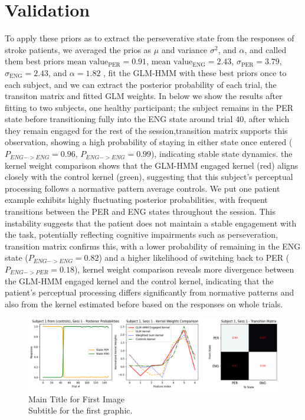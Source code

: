 \section{Validation}
To apply these priors as to extract the perseverative state from the responses of stroke patients, we averaged the prios as $\mu$ and variance $\sigma^2$, and $\alpha$, and called them best priors $\text{mean value}_{\text{PER}} = 0.91$, $\text{mean value}_{\text{ENG}} = 2.43$, $\sigma_{\text{PER}} = 3.79$, $\sigma_{\text{ENG}} = 2.43$, and $\alpha = 1.82$ , fit the GLM-HMM with these best priors once to each subject, and we can extract the posterior probability of each trial, the transiton matrix and fitted GLM weights. In below we show the results after fitting to two subjects, one healthy participant; the subject remains in the PER state before transitioning fully into the ENG state around trial 40, after which they remain engaged for the rest of the session,transition matrix supports this observation, showing a high probability of staying in either state once entered ($P_{ENG->ENG}=0.96$, $P_{ENG->ENG}=0.99$), indicating stable state dynamics.  the kernel weight comparison shows that the GLM-HMM engaged kernel (red) aligns closely with the control kernel (green), suggesting that this subject's perceptual processing follows a normative pattern average controls. We put one patient example exhibits highly fluctuating posterior probabilities, with frequent transitions between the PER and ENG states throughout the session. This instability suggests that the patient does not maintain a stable engagement with the task, potentially reflecting cognitive impairments such as perseveration,  transition matrix confirms this, with a lower probability of remaining in the ENG state ($P_{ENG->ENG}=0.82$) and a higher likelihood of switching back to PER ($P_{ENG->PER}=0.18$), kernel weight comparison reveals more divergence between the GLM-HMM engaged kernel and the control kernel, indicating that the patient’s perceptual processing differs significantly from normative patterns and also from the kernel estimated before based on the responses on whole trials.  
\begin{figure}[H]
    \centering
    \includegraphics[width=18cm]{MainLayout/Images/chapter7/subject_1_session_1.png}
    \caption{Main Title for First Image \\ \small Subtitle for the first graphic.}
    \label{fig:control_after_glmhmm}
\end{figure}
